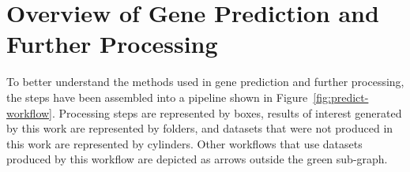 





\section{Overview of Gene Prediction and Further Processing}\label{met:predict-workflow}

To better understand the methods used in gene prediction and further processing, the steps have been assembled into a pipeline shown in Figure~\ref{fig:predict-workflow}. Processing steps are represented by boxes,
results of interest generated by this work are represented by folders,
and datasets that were not produced in this work are represented by
cylinders. Other workflows that use datasets produced by this workflow
are depicted as arrows outside the green sub-graph.

